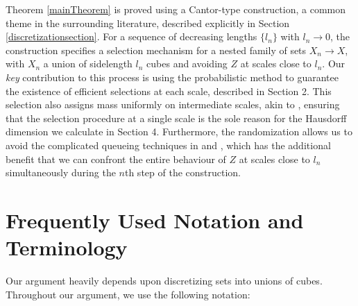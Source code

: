 Theorem \ref{mainTheorem} is proved using a Cantor-type construction, a common theme in the surrounding literature, described explicitly in Section \ref{discretizationsection}. For a sequence of decreasing lengths $\{ l_n \}$ with $l_n \to 0$, the construction specifies a selection mechanism for a nested family of sets $X_n \to X$, with $X_n$ a union of sidelength $l_n$ cubes and avoiding $Z$ at scales close to $l_n$. Our {\it key} contribution to this process is using the probabilistic method to guarantee the existence of efficient selections at each scale, described in Section 2. This selection also assigns mass uniformly on intermediate scales, akin to \cite{MalabikaRob}, ensuring that the selection procedure at a single scale is the sole reason for the Hausdorff dimension we calculate in Section 4. Furthermore, the randomization allows us to avoid the complicated queueing techniques in \cite{KeletiDimOneSet} and \cite{MalabikaRob}, which has the additional benefit that we can confront the entire behaviour of $Z$ at scales close to $l_n$ simultaneously during the $n$th step of the construction.










\section{Frequently Used Notation and Terminology}\label{notationSection}

Our argument heavily depends upon discretizing sets into unions of cubes. Throughout our argument, we use the following notation:


